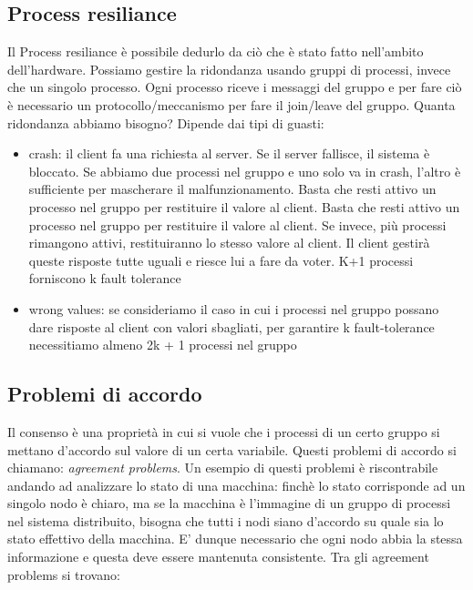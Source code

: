 \subsection{Process resiliance}
Il Process resiliance è possibile dedurlo da ciò che è stato fatto nell'ambito dell'hardware. Possiamo gestire la ridondanza usando gruppi di processi, invece che un singolo processo. Ogni processo riceve i messaggi del gruppo e per fare ciò è necessario un protocollo/meccanismo per fare il join/leave del gruppo. Quanta ridondanza abbiamo bisogno? Dipende dai tipi di guasti:

\begin{itemize}
    \item crash: il client fa una richiesta al server. Se il server fallisce, il sistema è bloccato. Se abbiamo due processi nel gruppo e uno solo va in crash, l'altro è sufficiente per mascherare il malfunzionamento. Basta che resti attivo un processo nel gruppo per restituire il valore al client. Basta che resti attivo un processo nel gruppo per restituire il valore al client. Se invece, più processi rimangono attivi, restituiranno lo stesso valore al client. Il client gestirà  queste risposte tutte uguali e riesce lui a fare da voter. K+1 processi forniscono k fault tolerance
    \item wrong values: se consideriamo il caso in cui i processi nel gruppo possano dare risposte al client con valori sbagliati, per garantire k fault-tolerance necessitiamo almeno 2k + 1 processi nel gruppo
\end{itemize}


\subsection{Problemi di accordo}
Il consenso è una proprietà in cui si vuole che i processi di un certo gruppo si mettano d'accordo sul valore di un certa variabile. Questi problemi di accordo si chiamano: \textit{agreement problems}. Un esempio di questi problemi è riscontrabile andando ad analizzare lo stato di una macchina: finchè lo stato corrisponde ad un singolo nodo è chiaro, ma se la macchina è l'immagine di un gruppo di processi nel sistema distribuito, bisogna che tutti i nodi siano d'accordo su quale sia lo stato effettivo della macchina. E' dunque necessario che ogni nodo abbia la stessa informazione e questa deve essere mantenuta consistente.
Tra gli agreement problems si trovano:

